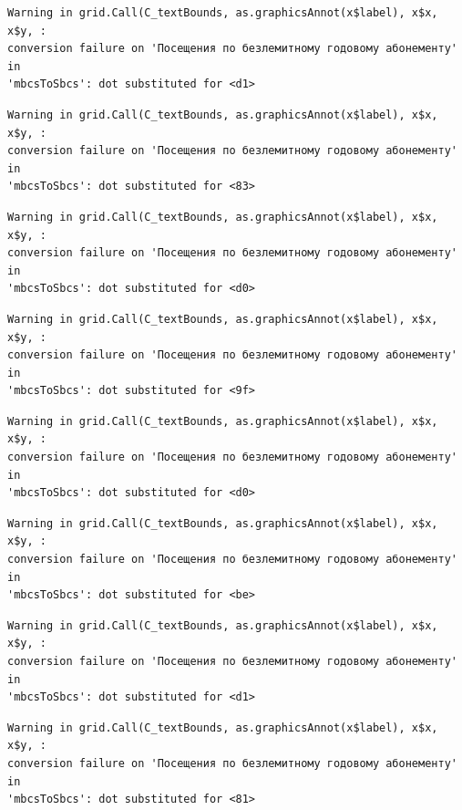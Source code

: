 \documentclass[
  letterpaper,
  DIV=11,
  numbers=noendperiod]{scrartcl}
\begin{document}
\begin{verbatim}
Warning in grid.Call(C_textBounds, as.graphicsAnnot(x$label), x$x, x$y, :
conversion failure on 'Посещения по безлемитному годовому абонементу' in
'mbcsToSbcs': dot substituted for <d1>
\end{verbatim}

\begin{verbatim}
Warning in grid.Call(C_textBounds, as.graphicsAnnot(x$label), x$x, x$y, :
conversion failure on 'Посещения по безлемитному годовому абонементу' in
'mbcsToSbcs': dot substituted for <83>
\end{verbatim}

\begin{verbatim}
Warning in grid.Call(C_textBounds, as.graphicsAnnot(x$label), x$x, x$y, :
conversion failure on 'Посещения по безлемитному годовому абонементу' in
'mbcsToSbcs': dot substituted for <d0>
\end{verbatim}

\begin{verbatim}
Warning in grid.Call(C_textBounds, as.graphicsAnnot(x$label), x$x, x$y, :
conversion failure on 'Посещения по безлемитному годовому абонементу' in
'mbcsToSbcs': dot substituted for <9f>
\end{verbatim}

\begin{verbatim}
Warning in grid.Call(C_textBounds, as.graphicsAnnot(x$label), x$x, x$y, :
conversion failure on 'Посещения по безлемитному годовому абонементу' in
'mbcsToSbcs': dot substituted for <d0>
\end{verbatim}

\begin{verbatim}
Warning in grid.Call(C_textBounds, as.graphicsAnnot(x$label), x$x, x$y, :
conversion failure on 'Посещения по безлемитному годовому абонементу' in
'mbcsToSbcs': dot substituted for <be>
\end{verbatim}

\begin{verbatim}
Warning in grid.Call(C_textBounds, as.graphicsAnnot(x$label), x$x, x$y, :
conversion failure on 'Посещения по безлемитному годовому абонементу' in
'mbcsToSbcs': dot substituted for <d1>
\end{verbatim}

\begin{verbatim}
Warning in grid.Call(C_textBounds, as.graphicsAnnot(x$label), x$x, x$y, :
conversion failure on 'Посещения по безлемитному годовому абонементу' in
'mbcsToSbcs': dot substituted for <81>
\end{verbatim}
\end{document}
